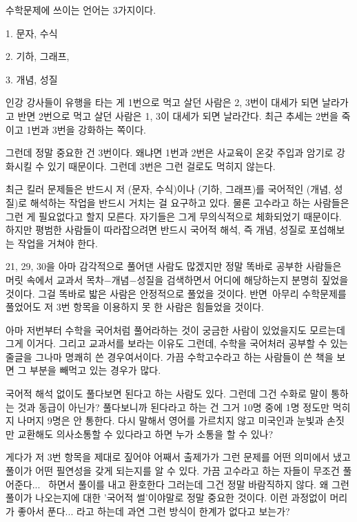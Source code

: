 수학문제에 쓰이는 언어는 3가지이다.
\vspace{5mm}

\item 1. 문자, 수식
\item 2. 기하, 그래프,
\item 3. 개념, 성질
\vspace{5mm}

인강 강사들이 유행을 타는 게 1번으로 먹고 살던 사람은 2, 3번이 대세가 되면 날라가고
반면 2번으로 먹고 살던 사람은 1, 3이 대세가 되면 날라간다.
최근 추세는 2번을 죽이고 1번과 3번을 강화하는 쪽이다.
\vspace{5mm}

그런데 정말 중요한 건 3번이다.
왜냐면 1번과 2번은 사교육이 온갖 주입과 암기로 강화시킬 수 있기 때문이다.
그런데 3번은 그런 걸로도 먹히지 않는다.
\vspace{5mm}

최근 킬러 문제들은 반드시 저 (문자, 수식)이나 (기하, 그래프)를
국어적인 (개념, 성질)로 해석하는 작업을 반드시 거치는 걸 요구하고 있다.
물론 고수라고 하는 사람들은 그런 게 필요없다고 할지 모른다. 자기들은 그게 무의식적으로 체화되었기 때문이다.
하지만 평범한 사람들이 따라잡으려면 반드시 국어적 해석, 즉 개념, 성질로 포섭해보는 작업을 거쳐야 한다.
\vspace{5mm}

21, 29, 30을 아마 감각적으로 풀어댄 사람도 많겠지만
정말 똑바로 공부한 사람들은 머릿 속에서 교과서 목차$-$개념$-$성질을 검색하면서 어디에 해당하는지 분명히 짚었을 것이다.
그걸 똑바로 밟은 사람은 안정적으로 풀었을 것이다.
반면 아무리 수학문제를 풀었어도 저 3번 항목을 이용하지 못 한 사람은 힘들었을 것이다.
\vspace{5mm}

아마 저번부터 수학을 국어처럼 풀어라하는 것이 궁금한 사람이 있었을지도 모르는데 그게 이거다.
그리고 교과서를 보라는 이유도 그런데, 수학을 국어처러 공부할 수 있는 줄글을 그나마 명쾌히 쓴 경우여서이다.
가끔 수학고수라고 하는 사람들이 쓴 책을 보면 그 부분을 빼먹고 있는 경우가 많다.
\vspace{5mm}

국어적 해석 없이도 풀다보면 된다고 하는 사람도 있다. 그런데 그건 수화로 말이 통하는 것과 동급이 아닌가?
풀다보니까 된다라고 하는 건 그거 10명 중에 1명 정도만 먹히지 나머지 9명은 안 통한다.
다시 말해서 영어를 가르치지 않고 미국인과 눈빛과 손짓만 교환해도 의사소통할 수 있다라고 하면 누가 소통을 할 수 있나?
\vspace{5mm}

게다가 저 3번 항목을 제대로 짚어야
어째서 출제가가 그런 문제를 어떤 의미에서 냈고
풀이가 어떤 필연성을 갖게 되는지를 알 수 있다.
가끔 고수라고 하는 자들이 무조건 풀어준다...  하면서 풀이를 내고 환호한다 그러는데 그건 정말 바람직하지 않다.
왜 그런 풀이가 나오는지에 대한 '국어적 썰'이야말로 정말 중요한 것이다.
이런 과정없이 머리가 좋아서 푼다... 라고 하는데 과연 그런 방식이 한계가 없다고 보는가?
\vspace{5mm}

